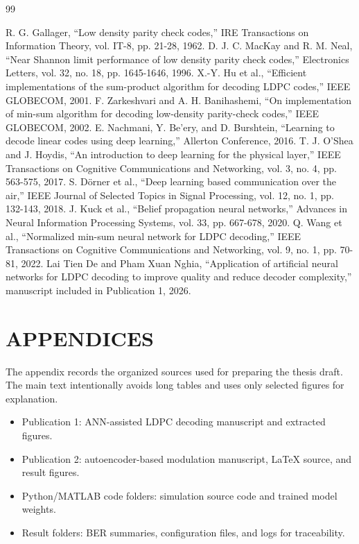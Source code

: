 \begin{thebibliography}{99}
 R. G. Gallager, “Low density parity check codes,” IRE Transactions on Information Theory, vol. IT-8, pp. 21-28, 1962.
 D. J. C. MacKay and R. M. Neal, “Near Shannon limit performance of low density parity check codes,” Electronics Letters, vol. 32, no. 18, pp. 1645-1646, 1996.
 X.-Y. Hu et al., “Efficient implementations of the sum-product algorithm for decoding LDPC codes,” IEEE GLOBECOM, 2001.
 F. Zarkeshvari and A. H. Banihashemi, “On implementation of min-sum algorithm for decoding low-density parity-check codes,” IEEE GLOBECOM, 2002.
 E. Nachmani, Y. Be'ery, and D. Burshtein, “Learning to decode linear codes using deep learning,” Allerton Conference, 2016.
 T. J. O'Shea and J. Hoydis, “An introduction to deep learning for the physical layer,” IEEE Transactions on Cognitive Communications and Networking, vol. 3, no. 4, pp. 563-575, 2017.
 S. Dörner et al., “Deep learning based communication over the air,” IEEE Journal of Selected Topics in Signal Processing, vol. 12, no. 1, pp. 132-143, 2018.
 J. Kuck et al., “Belief propagation neural networks,” Advances in Neural Information Processing Systems, vol. 33, pp. 667-678, 2020.
 Q. Wang et al., “Normalized min-sum neural network for LDPC decoding,” IEEE Transactions on Cognitive Communications and Networking, vol. 9, no. 1, pp. 70-81, 2022.
 Lai Tien De and Pham Xuan Nghia, “Application of artificial neural networks for LDPC decoding to improve quality and reduce decoder complexity,” manuscript included in Publication 1, 2026.
\end{thebibliography}
\appendix
\chapter*{APPENDICES}
The appendix records the organized sources used for preparing the thesis draft. The main text intentionally avoids long tables and uses only selected figures for explanation.

\begin{itemize}
\item Publication 1: ANN-assisted LDPC decoding manuscript and extracted figures.
\end{itemize}
\begin{itemize}
\item Publication 2: autoencoder-based modulation manuscript, LaTeX source, and result figures.
\end{itemize}
\begin{itemize}
\item Python/MATLAB code folders: simulation source code and trained model weights.
\end{itemize}
\begin{itemize}
\item Result folders: BER summaries, configuration files, and logs for traceability.
\end{itemize}
